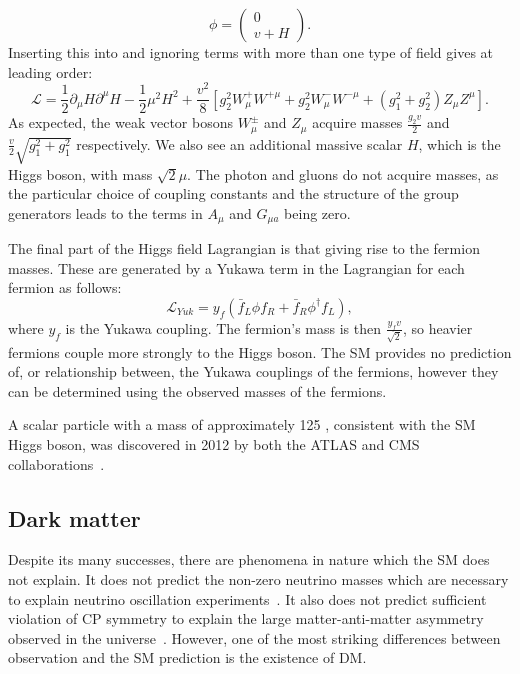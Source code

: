 \begin{equation}
  \phi=\left(\begin{array}{c}0 \\ v+H \end{array}\right).
\end{equation}
Inserting this into  and ignoring terms with more than one type of field gives at leading order:
\begin{equation}
  \mathcal{L}=\frac{1}{2}\partial_{\mu}H\partial^{\mu}H-\frac{1}{2}\mu^{2}H^{2}+\frac{v^{2}}{8}\left[g_{2}^{2}W_{\mu}^{+}W^{+\mu}+g_{2}^{2}W_{\mu}^{-}W^{-\mu}+\left(g_{1}^{2}+g_{2}^{2}\right)Z_{\mu}Z^{\mu}\right].
\end{equation}
As expected, the weak vector bosons $W_{\mu}^{\pm}$ and $Z_{\mu}$ acquire masses $\frac{g_{2}v}{2}$ and $\frac{v}{2}\sqrt{g_{1}^{2}+g_{1}^{2}}$ respectively. We also see an additional massive scalar $H$, which is the Higgs boson, with mass $\sqrt{2}\mu$. The photon and gluons do not acquire masses, as the particular choice of coupling constants and the structure of the group generators leads to the terms in $A_{\mu}$ and $G_{\mu a}$ being zero.

The final part of the Higgs field Lagrangian is that giving rise to the fermion masses. These are generated by a Yukawa term in the Lagrangian for each fermion as follows:
\begin{equation}
  \mathcal{L}_{Yuk}=y_{f}\left(\bar{f}_{L}\phi f_{R}+\bar{f}_{R}\phi^{\dag}f_{L}\right),
\end{equation}
where $y_{f}$ is the Yukawa coupling. The fermion's mass is then $\frac{y_{f}v}{\sqrt{2}}$, so heavier fermions couple more strongly to the Higgs boson. The \ac{SM} provides no prediction of, or relationship between, the Yukawa couplings of the fermions, however they can be determined using the observed masses of the fermions.

A scalar particle with a mass of approximately 125 \GeV, consistent with the \ac{SM} Higgs boson, was discovered in 2012 by both the ATLAS and CMS collaborations~\cite{Aad20121,Chatrchyan201230}.


\subsection{Dark matter}
\label{sec:DM}
Despite its many successes, there are phenomena in nature which the \ac{SM} does not explain. It does not predict the non-zero neutrino masses which are necessary to explain neutrino oscillation experiments~\cite{PhysRevLett.81.1158}. It also does not predict sufficient violation of CP symmetry to explain the large matter-anti-matter asymmetry observed in the universe~\cite{griffiths2008introduction}. However, one of the most striking differences between observation and the \ac{SM} prediction is the existence of \ac{DM}.

